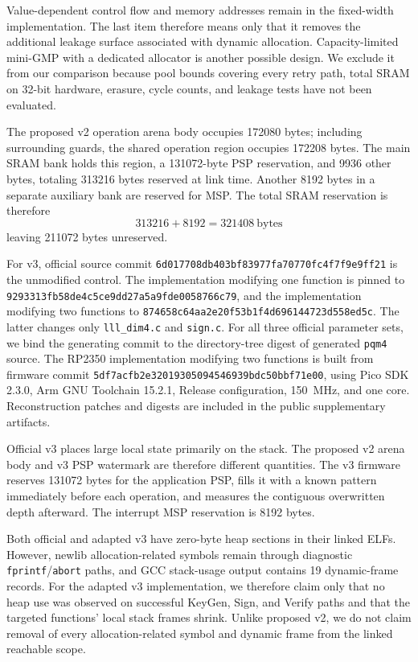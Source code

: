 \documentclass[a4paper,10pt]{article}
\theoremstyle{definition}
\theoremstyle{remark}
\begin{document}
Value-dependent control flow and memory addresses remain in the fixed-width implementation. The last item therefore means only that it removes the additional leakage surface associated with dynamic allocation. Capacity-limited mini-GMP with a dedicated allocator is another possible design. We exclude it from our comparison because pool bounds covering every retry path, total SRAM on 32-bit hardware, erasure, cycle counts, and leakage tests have not been evaluated.

The proposed v2 operation arena body occupies \num{172080} bytes; including surrounding guards, the shared operation region occupies \num{172208} bytes. The main SRAM bank holds this region, a \num{131072}-byte PSP reservation, and \num{9936} other bytes, totaling \num{313216} bytes reserved at link time. Another \num{8192} bytes in a separate auxiliary bank are reserved for MSP. The total SRAM reservation is therefore
\begin{equation}
  \num{313216}+\num{8192}=\num{321408}\ \text{bytes}
\end{equation}
leaving \num{211072} bytes unreserved.

For v3, official source commit \texttt{6d017708db403bf83977fa70770fc4f7f9e9ff21} is the unmodified control. The implementation modifying one function is pinned to \texttt{9293313fb58de4c5ce9dd27a5a9fde0058766c79}, and the implementation modifying two functions to \texttt{874658c64aa2e20f53b1f4d696144723d558ed5c}. The latter changes only \texttt{lll\_dim4.c} and \texttt{sign.c}. For all three official parameter sets, we bind the generating commit to the directory-tree digest of generated \texttt{pqm4} source. The RP2350 implementation modifying two functions is built from firmware commit \texttt{5df7acfb2e32019305094546939bdc50bbf71e00}, using Pico SDK 2.3.0, Arm GNU Toolchain 15.2.1, Release configuration, \SI{150}{\mega\hertz}, and one core. Reconstruction patches and digests are included in the public supplementary artifacts.

Official v3 places large local state primarily on the stack. The proposed v2 arena body and v3 PSP watermark are therefore different quantities. The v3 firmware reserves \num{131072} bytes for the application PSP, fills it with a known pattern immediately before each operation, and measures the contiguous overwritten depth afterward. The interrupt MSP reservation is \num{8192} bytes.

Both official and adapted v3 have zero-byte heap sections in their linked ELFs. However, newlib allocation-related symbols remain through diagnostic \texttt{fprintf}/\texttt{abort} paths, and GCC stack-usage output contains 19 dynamic-frame records. For the adapted v3 implementation, we therefore claim only that no heap use was observed on successful KeyGen, Sign, and Verify paths and that the targeted functions' local stack frames shrink. Unlike proposed v2, we do not claim removal of every allocation-related symbol and dynamic frame from the linked reachable scope.
\end{document}
